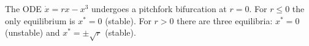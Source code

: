 
\begin{claim}
The ODE $\dot{x} = r x - x^3$ undergoes a pitchfork bifurcation at $r = 0$.
For $r \leq 0$ the only equilibrium is $x^* = 0$ (stable).
For $r > 0$ there are three equilibria: $x^* = 0$ (unstable) and $x^* = \pm\sqrt{r}$ (stable).
\end{claim}
